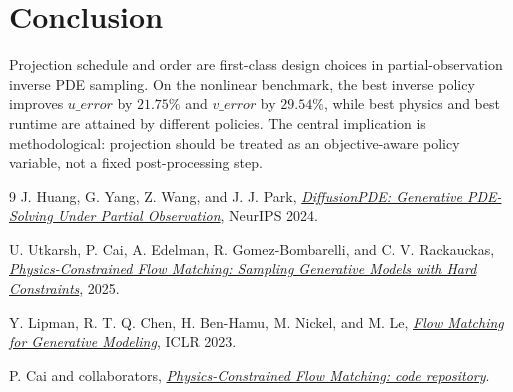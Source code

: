 \documentclass[10pt,twocolumn]{article}
\begin{document}
\section{Conclusion}
Projection schedule and order are first-class design choices in partial-observation inverse PDE sampling. On the nonlinear benchmark, the best inverse policy improves \(u\_error\) by \(21.75\%\) and \(v\_error\) by \(29.54\%\), while best physics and best runtime are attained by different policies. The central implication is methodological: projection should be treated as an objective-aware policy variable, not a fixed post-processing step.

\begingroup
\small
\begin{thebibliography}{9}
J. Huang, G. Yang, Z. Wang, and J. J. Park, \href{https://proceedings.neurips.cc/paper_files/paper/2024/hash/eb3878c1dcbfff9ee95d5d033e5f5942-Abstract-Conference.html}{\emph{DiffusionPDE: Generative PDE-Solving Under Partial Observation}}, NeurIPS 2024.

U. Utkarsh, P. Cai, A. Edelman, R. Gomez-Bombarelli, and C. V. Rackauckas, \href{https://arxiv.org/abs/2506.04171}{\emph{Physics-Constrained Flow Matching: Sampling Generative Models with Hard Constraints}}, 2025.

Y. Lipman, R. T. Q. Chen, H. Ben-Hamu, M. Nickel, and M. Le, \href{https://arxiv.org/abs/2210.02747}{\emph{Flow Matching for Generative Modeling}}, ICLR 2023.

P. Cai and collaborators, \href{https://github.com/cpfpengfei/PCFM}{\emph{Physics-Constrained Flow Matching: code repository}}.

\end{thebibliography}
\endgroup
\end{document}
